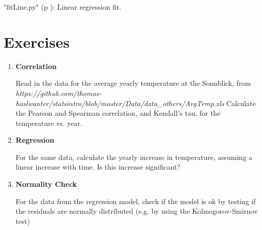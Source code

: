 \PyImg "fitLine.py" (p \pageref{py:fitLine}): Linear regression fit.

\section{Exercises}

\begin{enumerate}
  \item \textbf{Correlation}

    Read in the data for the average yearly temperature at the Sonnblick, from     \emph{https://github.com/thomas-haslwanter/statsintro/blob/master/Data/data\_others/AvgTemp.xls}
    Calculate the Pearson and Spearman correlation, and Kendall's tau, for the temperature vs. year.

  \item \textbf{Regression}

    For the same data, calculate the yearly increase in temperature, assuming a linear increase with time.
    Is this increase significant?

  \item \textbf{Normality Check}

    For the data from the regression model, check if the model is ok by testing if the residuals are normally distributed (e.g. by using the Kolmogorov-Smirnov test)

\end{enumerate}


